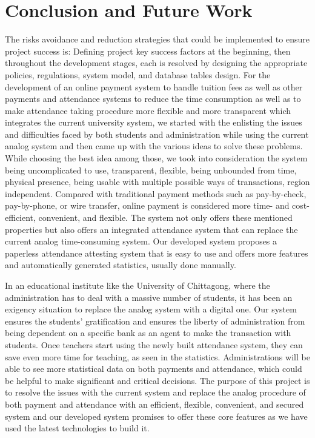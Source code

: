 \section{Conclusion and Future Work}\label{sec:cfw}
The risks avoidance and reduction strategies that could be implemented to ensure project success is: Defining project key success factors at the beginning, then throughout the development stages, each is resolved by designing the appropriate policies, regulations, system model, and database tables design. For the development of an online payment system to handle tuition fees as well as other payments and attendance systems to reduce the time consumption as well as to make attendance taking procedure more flexible and more transparent which integrates the current university system, we started with the enlisting the issues and difficulties faced by both students and administration while using the current analog system and then came up with the various ideas to solve these problems. While choosing the best idea among those, we took into consideration the system being uncomplicated to use, transparent, flexible, being unbounded from time, physical presence, being usable with multiple possible ways of transactions, region independent. Compared with traditional payment methods such as pay-by-check, pay-by-phone, or wire transfer, online payment is considered more time- and cost-efficient, convenient, and flexible. The system not only offers these mentioned properties but also offers an integrated attendance system that can replace the current analog time-consuming system. Our developed system proposes a paperless attendance attesting system that is easy to use and offers more features and automatically generated statistics, usually done manually.

In an educational institute like the University of Chittagong, where the administration has to deal with a massive number of students, it has been an exigency situation to replace the analog system with a digital one. Our system ensures the students' gratification and ensures the liberty of administration from being dependent on a specific bank as an agent to make the transaction with students. Once teachers start using the newly built attendance system, they can save even more time for teaching, as seen in the statistics. Administrations will be able to see more statistical data on both payments and attendance, which could be helpful to make significant and critical decisions. The purpose of this project is to resolve the issues with the current system and replace the analog procedure of both payment and attendance with an efficient, flexible, convenient, and secured system and our developed system promises to offer these core features as we have used the latest technologies to build it.


